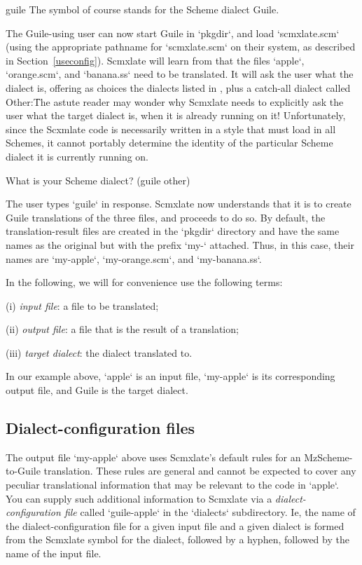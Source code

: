 \begintts
guile
\endtt
The symbol  of course stands for the Scheme
dialect Guile.

The Guile-using user can now start Guile in `pkgdir`,
and load `scmxlate.scm` (using the appropriate
pathname for `scmxlate.scm` on their system, as
described in Section~\ref{useconfig}).  Scmxlate will learn
from  that the files
`apple`, `orange.scm`, and `banana.ss` need to be
translated.  It will ask the user what the dialect is,
offering as choices the dialects listed in
, plus a catch-all
dialect called Other:\f{The astute reader may wonder
why Scmxlate needs to explicitly ask the user what the
target dialect is, when it is already running on it!
Unfortunately, since the Scxmlate code is necessarily
written in a style that must load in all Schemes, it
cannot portably determine the identity of the
particular Scheme dialect it is currently running on.}

\begintt
What is your Scheme dialect?
     (guile other)
\endtt

The user types `guile` in response.  Scmxlate now
understands that it is to create Guile translations of
the three files, and proceeds to do so.  By default,
the translation-result files are created in the
`pkgdir` directory and have the same names as the
original but with the prefix `my-` attached.  Thus,
in this case, their names are `my-apple`,
`my-orange.scm`, and `my-banana.ss`.

In the following, we will for convenience use
the following terms:

(i) {\em input file}: a file to be translated;

(ii) {\em output file}: a file that is the result of
a translation;

(iii) {\em target dialect}: the dialect translated to.

\n In our example above, `apple` is an input
file, `my-apple` is its corresponding output file,
and Guile is the target dialect.

\subsection{Dialect-configuration files}

The output  file `my-apple` above uses Scmxlate’s
default rules for an MzScheme-to-Guile translation.
These rules are general and cannot be expected to cover
any peculiar translational information that may be
relevant to the code in `apple`.  You can supply such
additional information to Scmxlate via a {\em
dialect-configuration file} called `guile-apple` in
the `dialects` subdirectory.   Ie, the name of
the dialect-configuration file for a given input file
and a given dialect is formed from  the Scmxlate symbol
for the dialect, followed by a hyphen, followed by the
name of the input file.

